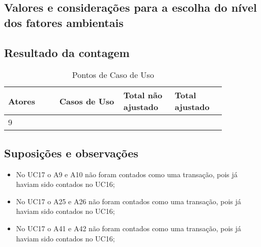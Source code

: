 \subsection{Valores e considerações para a escolha do nível dos fatores ambientais}

\pagebreak
\subsection{Resultado da contagem}

\begin{table*}[!h]
\centering
\caption{Pontos de Caso de Uso}
\label{Rotulo}
  \begin{tabular}{|p{0.20\linewidth}|p{0.25\linewidth}|p{0.20\linewidth}|p{0.20\linewidth}|}
  \hline
  \textbf{Atores} & \textbf{Casos de Uso} & \textbf{Total não ajustado} & \textbf{Total ajustado} \\ 
  \hline

  9 & & &\\
  \hline
  \end{tabular}
\end{table*}


\subsection{Suposições e observações}
  
  \begin{itemize}
   \item No UC17 o A9 e A10 não foram contados como uma transação, pois já haviam sido contados no UC16;	
   \item No UC17 o A25 e A26 não foram contados como uma transação, pois já haviam sido contados no UC16;	
   \item No UC17 o A41 e A42 não foram contados como uma transação, pois já haviam sido contados no UC16;	
\end{itemize}

  

